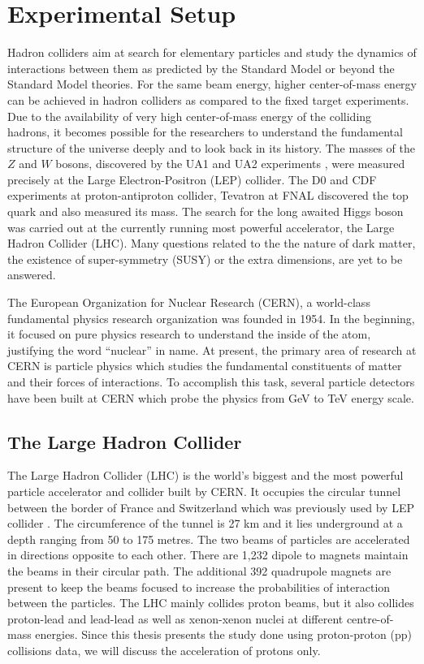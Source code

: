 \chapter{Experimental Setup}
\label{chap:Detector}
Hadron colliders aim at search for elementary particles and study the dynamics of interactions between them as predicted by the Standard Model or beyond the Standard Model theories. For the same beam energy, higher center-of-mass energy can be achieved in hadron colliders as compared to the fixed target experiments. Due to the availability of very high center-of-mass energy of the colliding hadrons, it becomes possible for the researchers to understand the fundamental structure of the universe deeply and to look back in its history. The masses of the $Z$ and $W$ bosons, discovered by the UA1 and UA2 experiments \cite{Arnison:1983rp,Banner:1983jy}, were measured precisely at the Large Electron-Positron (LEP) collider. The D0 \cite{Abachi:1994je} and CDF \cite{Abe:1994st} experiments at proton-antiproton collider, Tevatron at FNAL discovered the top quark and also measured its mass. The search for the long awaited Higgs boson was carried out at the currently running most powerful accelerator, the Large Hadron Collider (LHC). Many questions related to the the nature of dark matter, the existence of super-symmetry (SUSY) or the extra dimensions, are yet to be answered. 

The European Organization for Nuclear Research (CERN), a world-class fundamental physics research organization was founded in 1954. In the beginning, it focused on pure physics research to understand the inside of the atom, justifying the word ``nuclear'' in name. At present, the primary area of research at CERN is particle physics which studies the fundamental constituents of matter and their forces of interactions. To accomplish this task, several particle detectors have been built at CERN which probe the physics from GeV to TeV energy scale.

\section{The Large Hadron Collider}
The Large Hadron Collider (LHC) \cite{Evans:2008zzb} is the world's biggest and the most powerful particle accelerator and collider built by CERN. It occupies the circular tunnel between the border of France and Switzerland which was previously used by LEP collider \cite{LEP}. The circumference of the tunnel is 27 km and it lies underground at a depth ranging from 50 to 175 metres. The two beams of particles are accelerated in directions opposite to each other. There are 1,232 dipole to magnets maintain the beams in their circular path. The additional 392 quadrupole magnets are present to keep the beams focused to increase the probabilities of interaction between the particles. The LHC mainly collides proton beams, but it also collides proton-lead and lead-lead as well as xenon-xenon nuclei at different centre-of-mass energies. Since this thesis presents the study done using proton-proton (pp) collisions data, we will discuss the acceleration of protons only. 

